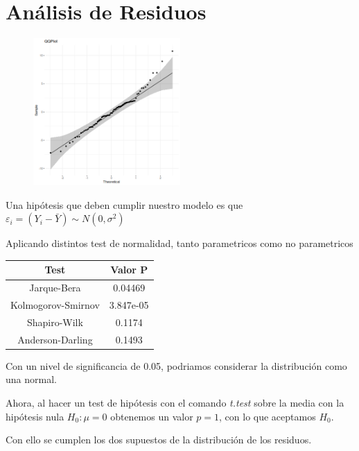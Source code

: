 \documentclass[onecolumn]{IEEEtran}
\begin{document}
    \section{An\'alisis de Residuos}
    \begin{figure}[ht]
        \centering
       \includegraphics[width=0.5\textwidth]{../plot2.png}
    \end{figure}
    Una hip\'otesis que deben cumplir nuestro modelo es que $\varepsilon_i = (Y_i - \bar{Y}) \sim N(0, \sigma^2)$

    Aplicando distintos test de normalidad, tanto parametricos como no parametricos
    
    \begin{table}[h]
        \begin{center}
            \begin{tabular}{|c|c|}
                \hline Test & Valor P \\ \hline
                Jarque-Bera & 0.04469 \\ \hline
                Kolmogorov-Smirnov & 3.847e-05\\ \hline
                Shapiro-Wilk & 0.1174 \\ \hline
                Anderson-Darling & 0.1493 \\ \hline
            \end{tabular}
        \end{center}
    \end{table}

    Con un nivel de significancia de 0.05, podriamos considerar la distribuci\'on como una normal.

    Ahora, al hacer un test de hip\'otesis con el comando \textit{t.test} sobre la media con la hip\'otesis nula $H_0: \mu = 0$ obtenemos un valor $p = 1$, con lo que aceptamos $H_0$.

    Con ello se cumplen los dos supuestos de la distribuci\'on de los residuos.
\end{document}
